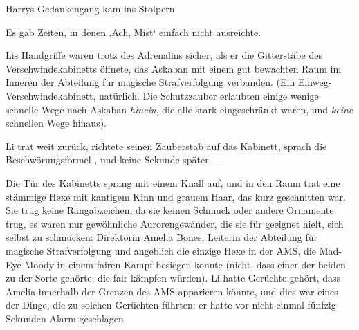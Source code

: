 Harrys Gedankengang kam ins Stolpern.

Es gab Zeiten, in denen ‚Ach, Mist‘ einfach nicht ausreichte.

\later

Lis Handgriffe waren trotz des Adrenalins sicher, als er die Gitterstäbe des Verschwindekabinetts öffnete, das Askaban mit einem gut bewachten Raum im Inneren der Abteilung für magische Strafverfolgung verbanden. (Ein Einweg-Verschwindekabinett, natürlich. Die Schutzzauber erlaubten einige wenige schnelle Wege nach Askaban \emph{hinein}, die alle stark eingeschränkt waren, und \emph{keine} schnellen Wege hinaus).

Li trat weit zurück, richtete seinen Zauberstab auf das Kabinett, sprach die Beschwörungsformel , und keine Sekunde später —

Die Tür des Kabinetts sprang mit einem Knall auf, und in den Raum trat eine stämmige Hexe mit kantigem Kinn und grauem Haar, das kurz geschnitten war. Sie trug keine Rangabzeichen, da sie keinen Schmuck oder andere Ornamente trug, es waren nur gewöhnliche Aurorengewänder, die sie für geeignet hielt, sich selbst zu schmücken: Direktorin Amelia Bones, Leiterin der Abteilung für magische Strafverfolgung und angeblich die einzige Hexe in der AMS, die Mad-Eye Moody in einem fairen Kampf besiegen konnte (nicht, dass einer der beiden zu der Sorte gehörte, die fair kämpfen würden). Li hatte Gerüchte gehört, dass Amelia innerhalb der Grenzen des AMS apparieren könnte, und dies war eines der Dinge, die zu solchen Gerüchten führten: er hatte vor nicht einmal fünfzig Sekunden Alarm geschlagen.

